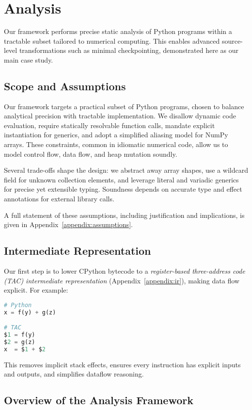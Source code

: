 \section{Analysis}
\label{sec:analysis}

Our framework performs precise static analysis of Python programs within a tractable subset tailored to numerical computing. This enables advanced source-level transformations such as minimal checkpointing, demonstrated here as our main case study.

\subsection{Scope and Assumptions}
\label{sec:scope}

Our framework targets a practical subset of Python programs, chosen to balance analytical precision with tractable implementation.  
We disallow dynamic code evaluation, require statically resolvable function calls, mandate explicit instantiation for generics, and adopt a simplified aliasing model for NumPy arrays.  
These constraints, common in idiomatic numerical code, allow us to model control flow, data flow, and heap mutation soundly.

Several trade-offs shape the design: we abstract away array shapes, use a wildcard field for unknown collection elements, and leverage literal and variadic generics for precise yet extensible typing.  
Soundness depends on accurate type and effect annotations for external library calls.  

A full statement of these assumptions, including justification and implications, is given in Appendix~\ref{appendix:assumptions}.

\subsection{Intermediate Representation}
Our first step is to lower CPython bytecode to a \emph{register-based three-address code (TAC) intermediate representation} (Appendix~\ref{appendix:ir}), making data flow explicit. For example:
\begin{lstlisting}[language=Python]
# Python
x = f(y) + g(z)

# TAC
$1 = f(y)
$2 = g(z)
x  = $1 + $2
\end{lstlisting}
This removes implicit stack effects, ensures every instruction has explicit inputs and outputs, and simplifies dataflow reasoning.

\subsection{Overview of the Analysis Framework}

